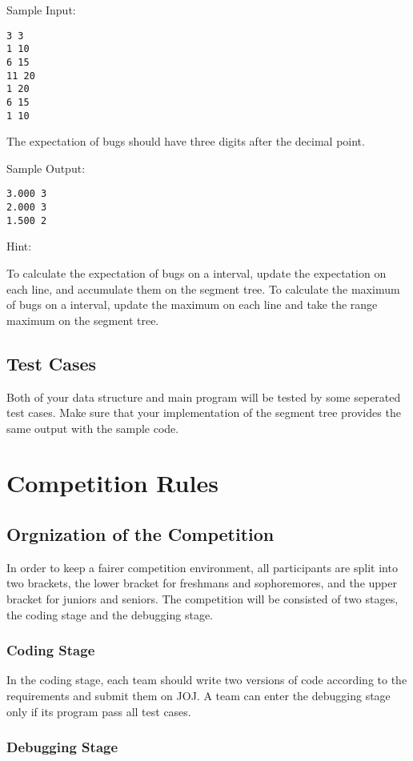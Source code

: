 \documentclass[11pt,a4paper]{article}
\begin{document}
Sample Input:
\begin{verbatim}
3 3
1 10
6 15
11 20
1 20
6 15
1 10
\end{verbatim}

The expectation of bugs should have three digits after the decimal point.

Sample Output:
\begin{verbatim}
3.000 3
2.000 3
1.500 2
\end{verbatim}

Hint:

To calculate the expectation of bugs on a interval, update the expectation on each line, and accumulate them on the segment tree. To calculate the maximum of bugs on a interval, update the maximum on each line and take the range maximum on the segment tree.

\subsection{Test Cases}

Both of your data structure and main program will be tested by some seperated test cases. Make sure that your implementation of the segment tree provides the same output with the sample code.

\section{Competition Rules}

\subsection{Orgnization of the Competition}

In order to keep a fairer competition environment, all participants are split into two brackets, the lower bracket for freshmans and sophoremores, and the upper bracket for juniors and seniors. The competition will be consisted of two stages, the coding stage and the debugging stage.

\subsubsection{Coding Stage}

In the coding stage, each team should write two versions of code according to the requirements and submit them on JOJ. A team can enter the debugging stage only if its program pass all test cases.

\subsubsection{Debugging Stage}
\end{document}
